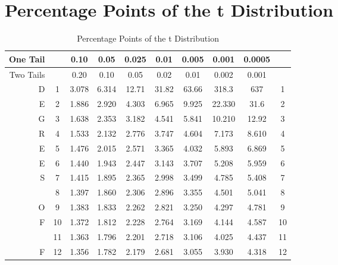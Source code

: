 %
%

\chapter{Percentage Points of the t Distribution}
\begin{center}
\end{center}
\begin{table}[h]\caption{Percentage Points of the t Distribution}\label{Appendix}
\begin{center}\scriptsize
\begin{tabular}{|r|c|c|c|c|c|c|c|c|c|}
\hline One Tail & & 0.10 & 0.05 & 0.025 & 0.01 & 0.005 & 0.001 & 0.0005 &\\ 
\hline Two Tails & & 0.20 &   0.10 &   0.05 &   0.02  &  0.01  &  0.002 & 0.001 & \\ 
\hline D  & 1 &   3.078  & 6.314 & 12.71  & 31.82  & 63.66 & 318.3  & 637 & 1  \\ 
\hline E  & 2 &   1.886  & 2.920 &  4.303 &  6.965 &  9.925 & 22.330 & 31.6 & 2 \\ 
\hline G  & 3 &   1.638  & 2.353 &  3.182 &  4.541 &  5.841 & 10.210 & 12.92  &   3  \\ 
\hline R  & 4 &   1.533  & 2.132 &  2.776 &  3.747 &  4.604 &  7.173 &  8.610 &   4  \\ 
\hline E  & 5 &   1.476 &  2.015 &  2.571 &  3.365 &  4.032 &  5.893 &  6.869 &   5 \\ 
\hline E  & 6 &   1.440 &  1.943 &  2.447 &  3.143 &  3.707 &  5.208 &  5.959 &   6  \\ 
\hline S  & 7 &   1.415 &  1.895 &  2.365 &  2.998 &  3.499 &  4.785 &  5.408 &   7  \\ 
\hline    & 8 &   1.397 &  1.860 &  2.306 &  2.896 &  3.355 &  4.501 &  5.041 &   8  \\ 
\hline O  & 9 &   1.383 &  1.833 &  2.262 &  2.821 &  3.250 &  4.297 &  4.781 &   9  \\ 
\hline F  &10 &   1.372 &  1.812 &  2.228 &  2.764 &  3.169 &  4.144 &  4.587 &  10 \\ 
\hline    &11 &   1.363 &  1.796 &  2.201 &  2.718 &  3.106 &  4.025 &  4.437 &  11  \\ 
\hline F  &12 &   1.356 &  1.782 &  2.179 &  2.681 &  3.055 &  3.930 &  4.318 &  12  \\ 

\end{tabular}
\end{center}
\end{table}
